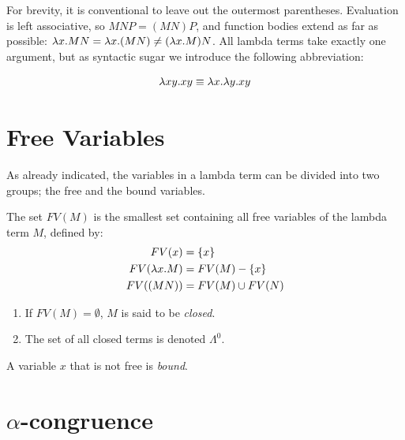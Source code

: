 For brevity, it is conventional to leave out the outermost parentheses.
Evaluation is left associative, so $M N P = (M N) P$, and function
bodies extend as far as possible: $\lambda x.M N=\lambda x.(M N)\neq(\lambda x.M)N$.
All lambda terms take exactly one argument, but as syntactic sugar we introduce
the following abbreviation:
\begin{abbreviation}
\begin{align*}
	\lambda xy.xy\equiv\lambda x.\lambda y.xy
\end{align*}
\end{abbreviation}

\section{Free Variables}

As already indicated, the variables in a lambda term can be divided into
two groups; the free and the bound variables.

\begin{definition}
	The set $FV(M)$ is the smallest set containing all free variables of the lambda
	term $M$, defined by:
	\begin{align*}
		FV(x)&=\{x\} \\
		FV(\lambda x.M)&= FV(M) - \{x\} \\
		FV((M N)) &= FV(M) \cup FV(N)
	\end{align*}
\end{definition}
\begin{definition}
	\begin{enumerate}
		\item If $FV(M)=\emptyset$, $M$ is said to be \emph{closed}.
		\item The set of all closed terms is denoted $\Lambda^0$.
	\end{enumerate}
\end{definition}
\begin{definition}
	A variable $x$ that is not free is \emph{bound}.
\end{definition}

\section{$\alpha$-congruence}

